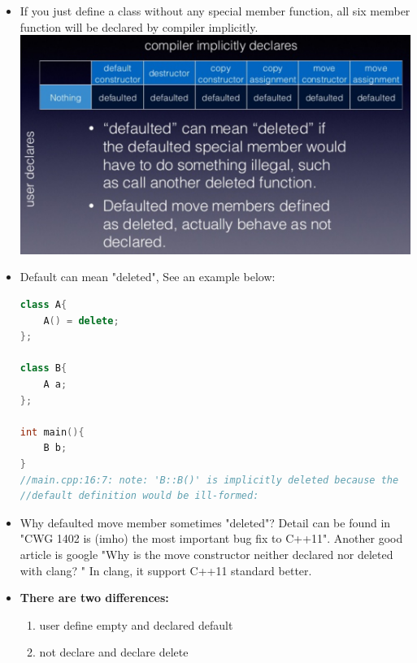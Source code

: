 \documentclass[a4paper,11pt,twoside]{book}
\begin{document}
\begin{itemize}
\item If you just define a class without any special member function, all six member function will be declared by compiler implicitly. \\
\includegraphics[scale=0.6]{pics/sm2.png} \newline


\item Default can mean "deleted", See an example below:

\begin{lstlisting}[frame=single, language=c++]
class A{
	A() = delete;
};

class B{
	A a;
};

int main(){
	B b;
}
//main.cpp:16:7: note: 'B::B()' is implicitly deleted because the 
//default definition would be ill-formed:
\end{lstlisting}

\item Why defaulted move member sometimes "deleted"? Detail can be found in "CWG 1402 is (imho) the most important bug fix to C++11". Another good article is google "Why is the move constructor neither declared nor deleted with clang? " In clang, it support C++11 standard better. 

\item \textbf{There are two differences:}
\begin{enumerate}
	\item user define empty and declared default
	\item not declare and declare delete
\end{enumerate}



\end{itemize}
\end{document}
